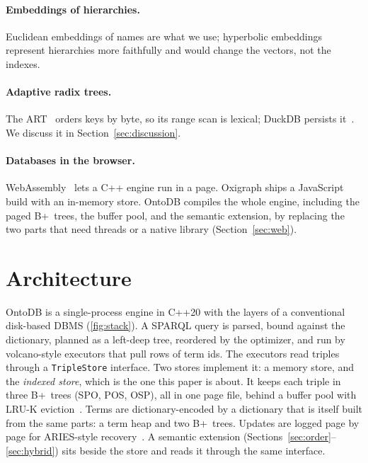 \documentclass[sigconf, nonacm]{acmart}
\newcommand{\sys}{OntoDB}
\newcommand{\code}[1]{\texttt{#1}}
\begin{document}
\paragraph{Embeddings of hierarchies.} Euclidean embeddings of names are what we use; hyperbolic embeddings~\cite{nickel2017} represent hierarchies more faithfully and would change the vectors, not the indexes.

\paragraph{Adaptive radix trees.} The ART~\cite{leis2013} orders keys by byte, so its range scan is lexical; DuckDB persists it~\cite{duckdbart}. We discuss it in Section~\ref{sec:discussion}.

\paragraph{Databases in the browser.} WebAssembly~\cite{haas2017} lets a C++ engine run in a page. Oxigraph ships a JavaScript build with an in-memory store. \sys{} compiles the whole engine, including the paged B+~trees, the buffer pool, and the semantic extension, by replacing the two parts that need threads or a native library (Section~\ref{sec:web}).

\section{Architecture}
\label{sec:arch}

\sys{} is a single-process engine in C++20 with the layers of a conventional disk-based DBMS (\autoref{fig:stack}). A SPARQL query is parsed, bound against the dictionary, planned as a left-deep tree, reordered by the optimizer, and run by volcano-style executors that pull rows of term ids. The executors read triples through a \code{TripleStore} interface. Two stores implement it: a memory store, and the \emph{indexed store}, which is the one this paper is about. It keeps each triple in three B+~trees (SPO, POS, OSP), all in one page file, behind a buffer pool with LRU-K eviction~\cite{oneil1993}. Terms are dictionary-encoded by a dictionary that is itself built from the same parts: a term heap and two B+~trees. Updates are logged page by page for ARIES-style recovery~\cite{mohan1992}. A semantic extension (Sections~\ref{sec:order}--\ref{sec:hybrid}) sits beside the store and reads it through the same interface.
\end{document}
